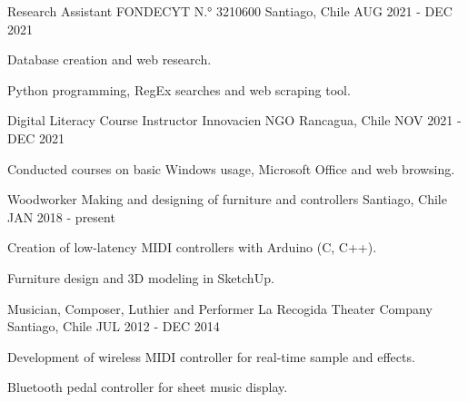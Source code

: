 \begin{cventries}
  \cventry
    {Research Assistant} %
    {FONDECYT N.° 3210600} %
    {Santiago, Chile} %
    {AUG 2021 - DEC 2021} %
    {
      \begin{cvitems} %
        \item {Database creation and web research.}
        \item {Python programming, RegEx searches and web scraping tool.}
      \end{cvitems}
    }

  \cventry
    {Digital Literacy Course Instructor} %
    {Innovacien NGO} %
    {Rancagua, Chile} %
    {NOV 2021 - DEC 2021} %
    {
      \begin{cvitems} %
        \item {Conducted courses on basic Windows usage, Microsoft Office and web browsing.}
      \end{cvitems}
    }

  \cventry
    {Woodworker} %
    {Making and designing of furniture and controllers} %
    {Santiago, Chile} %
    {JAN 2018 - present} %
    {
      \begin{cvitems} %
        \item {Creation of low-latency MIDI controllers with Arduino (C, C++).}
        \item {Furniture design and 3D modeling in SketchUp.}
      \end{cvitems}
    }

  \cventry
    {Musician, Composer, Luthier and Performer}
    {La Recogida Theater Company}
    {Santiago, Chile}
    {JUL 2012 - DEC 2014}
    {
      \begin{cvitems} %
        \item {Development of wireless MIDI controller for real-time sample and effects.}
        \item {Bluetooth pedal controller for sheet music display.}
      \end{cvitems}
    }   


\end{cventries}
